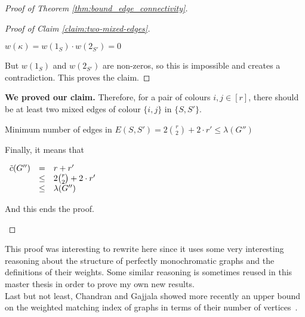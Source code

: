 \begin{proof}[Proof of Theorem \ref{thm:bound_edge_connectivity}]
\begin{enumerate}
\begin{enumerate}
\begin{proof}[Proof of Claim \ref{claim:two-mixed-edges}]
                        \begin{center}
                            $w(\kappa) = w(1_S) \cdot w(2_{S'}) = 0$
                        \end{center}
                        
                        But $w(1_S)$ and $w(2_{S'})$ are non-zeros, so this is impossible and creates a contradiction.
                        This proves the claim.
                    \end{proof}

                    \textbf{We proved our claim.}
                    Therefore, for a pair of colours $i, j \in [r]$, there should be at least two mixed edges of colour $\{i, j\}$ in $\{S, S'\}$.
                    
                    \begin{center}
                        Minimum number of edges in $E(S, S') = 2 {r \choose 2} + 2 \cdot r' \leq \lambda(G'')$
                    \end{center}
                    
                    Finally, it means that
                    
                    \begin{center}
                        $\begin{array}{lcl}
                            \Tilde{c}(G'') & =    & r + r' \\
                                           & \leq & 2 {r \choose 2} + 2 \cdot r' \\
                                           & \leq & \lambda(G'')
                        \end{array}$
                    \end{center}
                    
                    And this ends the proof.
            \end{enumerate}
    \end{enumerate}
\end{proof}

This proof was interesting to rewrite here since it uses some very interesting reasoning about the structure of perfectly monochromatic graphs and the definitions of their weights.
Some similar reasoning is sometimes reused in this master thesis in order to prove my own new results. \\

Last but not least, Chandran and Gajjala showed more recently an upper bound on the weighted matching index of graphs in terms of their number of vertices~\cite{chandran2023graphtheoretic}.

